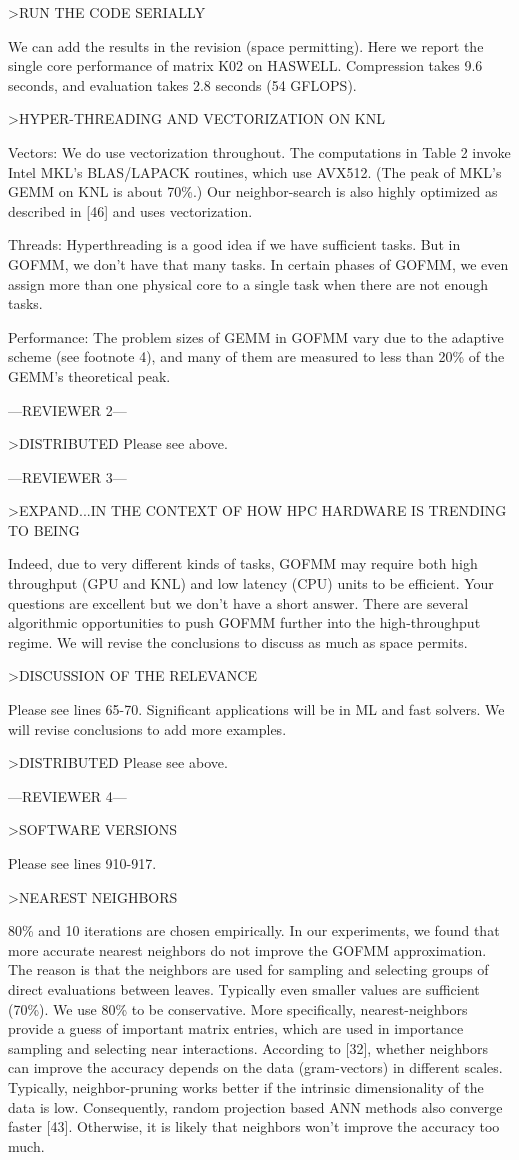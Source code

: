 >RUN THE CODE SERIALLY

We can add the results in the revision (space permitting).
Here we report the single core performance of matrix K02 on HASWELL.
Compression takes 9.6 seconds, and evaluation takes 2.8 seconds (54 GFLOPS).

>HYPER-THREADING AND VECTORIZATION ON KNL

Vectors: We do use vectorization throughout.
The computations in Table 2 invoke Intel MKL's BLAS/LAPACK routines,
which use AVX512. (The peak of MKL's GEMM on KNL is about 70\%.)
Our neighbor-search is also highly optimized as  described in [46] and uses vectorization. 

Threads: Hyperthreading is a good idea if we have sufficient tasks. But in GOFMM, we don't have that many tasks. In certain phases of GOFMM, we even assign more than one physical core to a single task when there are not enough tasks.

Performance: The problem sizes of GEMM in GOFMM vary due to the adaptive scheme
(see footnote 4), and many of them are measured to less than 20\% of the GEMM's theoretical peak.

---REVIEWER 2---

>DISTRIBUTED
Please see above.


---REVIEWER 3---

>EXPAND...IN THE CONTEXT OF HOW HPC HARDWARE IS TRENDING TO BEING

Indeed, due to very different kinds of tasks, GOFMM may require
both high throughput (GPU and KNL) and low latency (CPU) units
to be efficient.  Your questions are excellent but we don't have a short answer.  There are several algorithmic opportunities to push GOFMM further into the  high-throughput regime.   We will revise the conclusions to discuss as much as space permits.

>DISCUSSION OF THE RELEVANCE

Please see lines 65-70. Significant applications will be in ML and
fast solvers. We will revise conclusions to add more examples.

>DISTRIBUTED 
Please see above. 

---REVIEWER 4---

>SOFTWARE VERSIONS

Please see lines 910-917.

>NEAREST NEIGHBORS

80\% and 10 iterations are chosen empirically. 
In our experiments, we found that more accurate nearest neighbors do not improve
the GOFMM approximation.  The reason is that the neighbors are used for sampling and selecting groups of direct evaluations between leaves. 
Typically even smaller values are sufficient (70\%).  We use 80\% to be conservative.  More specifically, nearest-neighbors provide a guess of important matrix entries,  which are used in importance sampling and selecting near interactions. According to [32], whether neighbors can improve the accuracy depends on the data (gram-vectors) in different scales.
Typically, neighbor-pruning works better if the intrinsic dimensionality
of the data is low. Consequently, random projection based ANN methods 
also converge faster [43]. Otherwise, it is likely that
neighbors won't improve the accuracy too much.


